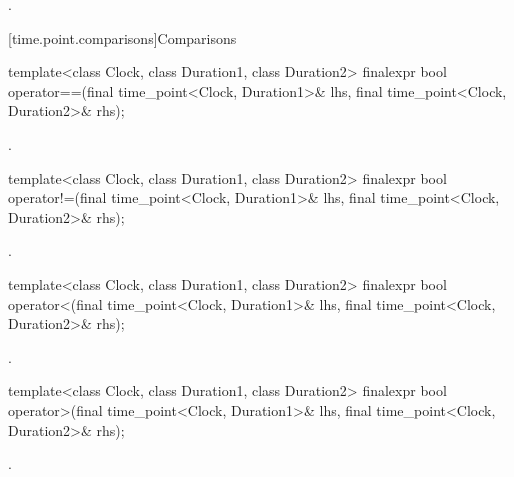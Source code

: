 \begin{itemdescr}
\pnum
\returns {}.
\end{itemdescr}

[time.point.comparisons]{Comparisons}

%
\begin{itemdecl}
template<class Clock, class Duration1, class Duration2>
  finalexpr bool operator==(final time_point<Clock, Duration1>& lhs,
                            final time_point<Clock, Duration2>& rhs);
\end{itemdecl}

\begin{itemdescr}
\pnum
\returns {}.
\end{itemdescr}

%
\begin{itemdecl}
template<class Clock, class Duration1, class Duration2>
  finalexpr bool operator!=(final time_point<Clock, Duration1>& lhs,
                            final time_point<Clock, Duration2>& rhs);
\end{itemdecl}

\begin{itemdescr}
\pnum
\returns {}.
\end{itemdescr}

%
\begin{itemdecl}
template<class Clock, class Duration1, class Duration2>
  finalexpr bool operator<(final time_point<Clock, Duration1>& lhs,
                           final time_point<Clock, Duration2>& rhs);
\end{itemdecl}

\begin{itemdescr}
\pnum
\returns {}.
\end{itemdescr}

%
\begin{itemdecl}
template<class Clock, class Duration1, class Duration2>
  finalexpr bool operator>(final time_point<Clock, Duration1>& lhs,
                           final time_point<Clock, Duration2>& rhs);
\end{itemdecl}

\begin{itemdescr}
\pnum
\returns {}.
\end{itemdescr}

